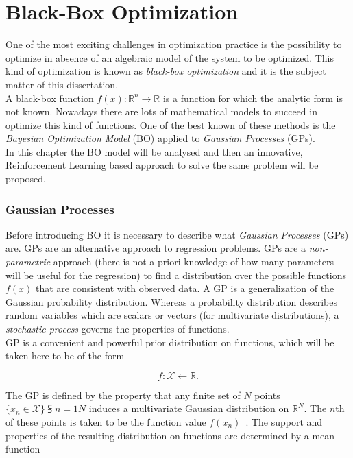 \chapter{Black-Box Optimization}

One of the most exciting challenges in optimization practice is the possibility to optimize in absence of an algebraic model of the system to be optimized. This kind of optimization is known as \textit{black-box optimization} and it is the subject matter of this dissertation. \\

A black-box function $f(x) : \mathbb{R}^n \rightarrow \mathbb{R}$ is a function for which the analytic form is not known. Nowadays there are lots of mathematical models to succeed in optimize this kind of functions. One of the best known of these methods is the \textit{Bayesian Optimization Model} (BO) applied to \textit{Gaussian Processes} (GPs). \\

In this chapter the BO model will be analysed and then an innovative, Reinforcement Learning  based approach to solve the same problem will be proposed.

\subsection{Gaussian Processes} Before introducing BO it is necessary to describe what \textit{Gaussian Processes} (GPs) are. GPs are an alternative approach to regression problems. GPs are a \textit{non-parametric} approach (there is not a priori knowledge of how many parameters will be useful for the regression) to find a distribution over the possible functions $f(x)$ that are consistent with observed data. A GP is a generalization of the Gaussian probability distribution. Whereas a probability distribution describes random variables which are scalars or vectors (for multivariate distributions), a \textit{stochastic process} governs the properties of functions. \\

GP is a convenient and powerful prior distribution on functions, which will be taken here to be of the form 

\begin{equation}
	f : \mathcal{X} \leftarrow \mathbb{R}.
\end{equation}

The GP is defined by the property that any finite set of $N$ points $\{x_n \in \mathcal{X}\}\subsup{}{ n=1}{N}$ induces a multivariate Gaussian distribution  on $\mathbb{R}^N$. The $n$th of these points is taken to be the function value $f(x_n)$~\cite{NIPS2012_4522}. The support and properties of the resulting distribution on functions are determined by a mean function 


